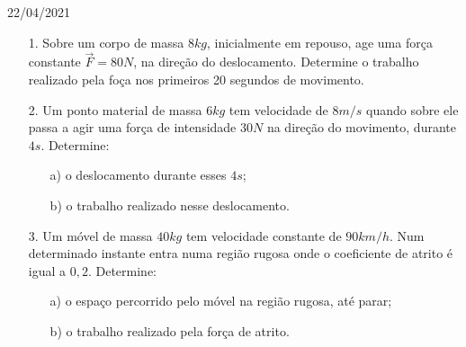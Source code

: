 \documentclass{SchoolBook}
\begin{document}
    \begin{day}{22/04/2021}
        \begin{enumerate}
            \item[1.] Sobre um corpo de massa $ 8 kg $, inicialmente em repouso, age uma força constante $ \vec{F} = 80 N $, na direção do deslocamento.
            Determine o trabalho realizado pela foça nos primeiros 20 segundos de movimento.

            \item[2.] Um ponto material de massa $ 6 kg $ tem velocidade de $ 8 m/s $ quando sobre ele passa a agir uma força de intensidade $ 30 N $ na direção do movimento, durante $ 4 s $. Determine:
            \begin{enumerate}
                \item[a)] o deslocamento durante esses $ 4 s$;
                \item[b)] o trabalho realizado nesse deslocamento.
            \end{enumerate}

            \item[3.] Um móvel de massa $ 40 kg $ tem velocidade constante de $ 90 km/h $.
            Num determinado instante entra numa região rugosa onde o coeficiente de atrito é igual a $ 0,2 $. Determine:
            \begin{enumerate}
                \item[a)] o espaço percorrido pelo móvel na região rugosa, até parar;
                \item[b)] o trabalho realizado pela força de atrito.
            \end{enumerate}
        \end{enumerate}
    \end{day}
    
\end{document}
